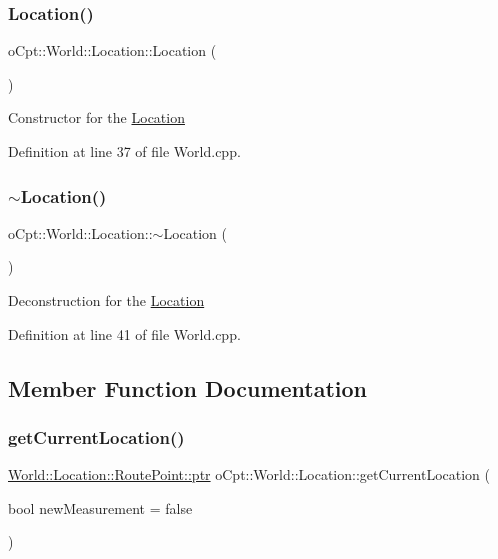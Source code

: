 \subsubsection{\texorpdfstring{Location()}{Location()}}
{\footnotesize\ttfamily o\+Cpt\+::\+World\+::\+Location\+::\+Location (\begin{DoxyParamCaption}{ }\end{DoxyParamCaption})}

Constructor for the \hyperlink{classo_cpt_1_1_world_1_1_location}{Location} 

Definition at line 37 of file World.\+cpp.

\hypertarget{classo_cpt_1_1_world_1_1_location_a5b1fb5e70e570eb3e0d48c49b1b7bd41}{}\label{classo_cpt_1_1_world_1_1_location_a5b1fb5e70e570eb3e0d48c49b1b7bd41} 
\subsubsection{\texorpdfstring{$\sim$\+Location()}{~Location()}}
{\footnotesize\ttfamily o\+Cpt\+::\+World\+::\+Location\+::$\sim$\+Location (\begin{DoxyParamCaption}{ }\end{DoxyParamCaption})\hspace{0.3cm}{\ttfamily [virtual]}}

Deconstruction for the \hyperlink{classo_cpt_1_1_world_1_1_location}{Location} 

Definition at line 41 of file World.\+cpp.



\subsection{Member Function Documentation}
\hypertarget{classo_cpt_1_1_world_1_1_location_a91d0729340a46c306af3fa6adb61c738}{}\label{classo_cpt_1_1_world_1_1_location_a91d0729340a46c306af3fa6adb61c738} 
\subsubsection{\texorpdfstring{get\+Current\+Location()}{getCurrentLocation()}}
{\footnotesize\ttfamily \hyperlink{structo_cpt_1_1_world_1_1_location_1_1_route_point_aa042feea77cb3c1531ab4e8ecf42fbd6}{World\+::\+Location\+::\+Route\+Point\+::ptr} o\+Cpt\+::\+World\+::\+Location\+::get\+Current\+Location (\begin{DoxyParamCaption}\item[{bool}]{new\+Measurement = {\ttfamily false} }\end{DoxyParamCaption})}

